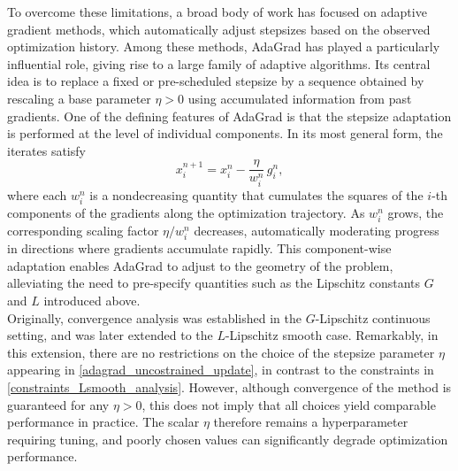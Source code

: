 \documentclass[11pt]{article}
\theoremstyle{plain}
\theoremstyle{definition}
\theoremstyle{remark}
\newcommand{\uu}{g}
\newcommand{\w}{w}
\newcommand{\iter}{n}
\begin{document}
\noindent
To overcome these limitations, a broad body of work has focused on adaptive gradient methods, which automatically adjust stepsizes based on the observed optimization history. Among these methods, AdaGrad \cite{duchi2011adaptive} has played a particularly influential role, giving rise to a large family of adaptive algorithms. Its central idea is to replace a fixed or pre-scheduled stepsize by a sequence obtained by rescaling a base parameter $\eta>0$ using accumulated information from past gradients. One of the defining features of AdaGrad is that the stepsize adaptation is performed at the level of individual components. In its most general form, the iterates satisfy
\begin{equation}\label{adagrad_uncostrained_update}
x_i^{\iter+1} = x_i^\iter - \frac{\eta}{\w_i^\iter}\,\uu_i^\iter,
\end{equation}
where each $\w_i^\iter$ is a nondecreasing quantity that cumulates the squares of the $i$-th components of the gradients along the optimization trajectory. As $\w_i^\iter$ grows, the corresponding scaling factor $\eta/\w_i^\iter$ decreases, automatically moderating progress in directions where gradients accumulate rapidly. This component-wise adaptation enables AdaGrad to adjust to the geometry of the problem, alleviating the need to pre-specify quantities such as the Lipschitz constants $G$ and $L$ introduced above.\\

\noindent
Originally, convergence analysis was established in the $G$-Lipschitz continuous setting, and was later extended to the $L$-Lipschitz smooth case. Remarkably, in this extension, there are no restrictions on the choice of the stepsize parameter $\eta$ appearing in \eqref{adagrad_uncostrained_update}, in contrast to the constraints in \eqref{constraints_Lsmooth_analysis}. However, although convergence of the method is guaranteed for any $\eta > 0$, this does not imply that all choices yield comparable performance in practice. The scalar $\eta$ therefore remains a hyperparameter requiring tuning, and poorly chosen values can significantly degrade optimization performance.\\
\end{document}
